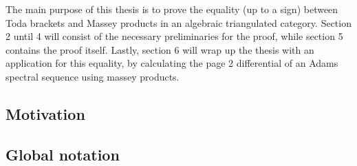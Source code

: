 The main purpose of this thesis is to prove the equality (up to a sign) between Toda brackets and Massey products in an algebraic triangulated category. Section 2 until 4 will consist of the necessary preliminaries for the proof, while section 5 contains the proof itself. Lastly, section 6 will wrap up the thesis with an application for this equality, by calculating the page 2 differential of an Adams spectral sequence using massey products.

\subsection{Motivation}


\subsection{Global notation}
